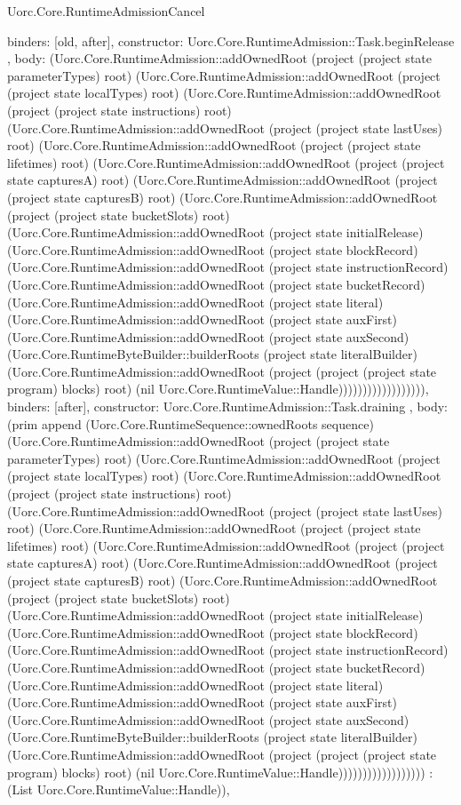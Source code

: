 \begin{lexlean}{Uorc.Core.RuntimeAdmissionCancel}
\begin{semanticmodule}
{{{        binders: [old, after],
        constructor: Uorc.Core.RuntimeAdmission::Task.beginRelease
      },
      {
        body: (Uorc.Core.RuntimeAdmission::addOwnedRoot (project (project state parameterTypes) root) (Uorc.Core.RuntimeAdmission::addOwnedRoot (project (project state localTypes) root) (Uorc.Core.RuntimeAdmission::addOwnedRoot (project (project state instructions) root) (Uorc.Core.RuntimeAdmission::addOwnedRoot (project (project state lastUses) root) (Uorc.Core.RuntimeAdmission::addOwnedRoot (project (project state lifetimes) root) (Uorc.Core.RuntimeAdmission::addOwnedRoot (project (project state capturesA) root) (Uorc.Core.RuntimeAdmission::addOwnedRoot (project (project state capturesB) root) (Uorc.Core.RuntimeAdmission::addOwnedRoot (project (project state bucketSlots) root) (Uorc.Core.RuntimeAdmission::addOwnedRoot (project state initialRelease) (Uorc.Core.RuntimeAdmission::addOwnedRoot (project state blockRecord) (Uorc.Core.RuntimeAdmission::addOwnedRoot (project state instructionRecord) (Uorc.Core.RuntimeAdmission::addOwnedRoot (project state bucketRecord) (Uorc.Core.RuntimeAdmission::addOwnedRoot (project state literal) (Uorc.Core.RuntimeAdmission::addOwnedRoot (project state auxFirst) (Uorc.Core.RuntimeAdmission::addOwnedRoot (project state auxSecond) (Uorc.Core.RuntimeByteBuilder::builderRoots (project state literalBuilder) (Uorc.Core.RuntimeAdmission::addOwnedRoot (project (project (project state program) blocks) root) (nil Uorc.Core.RuntimeValue::Handle)))))))))))))))))),
        binders: [after],
        constructor: Uorc.Core.RuntimeAdmission::Task.draining
      },
      {
        body: (prim append (Uorc.Core.RuntimeSequence::ownedRoots sequence) (Uorc.Core.RuntimeAdmission::addOwnedRoot (project (project state parameterTypes) root) (Uorc.Core.RuntimeAdmission::addOwnedRoot (project (project state localTypes) root) (Uorc.Core.RuntimeAdmission::addOwnedRoot (project (project state instructions) root) (Uorc.Core.RuntimeAdmission::addOwnedRoot (project (project state lastUses) root) (Uorc.Core.RuntimeAdmission::addOwnedRoot (project (project state lifetimes) root) (Uorc.Core.RuntimeAdmission::addOwnedRoot (project (project state capturesA) root) (Uorc.Core.RuntimeAdmission::addOwnedRoot (project (project state capturesB) root) (Uorc.Core.RuntimeAdmission::addOwnedRoot (project (project state bucketSlots) root) (Uorc.Core.RuntimeAdmission::addOwnedRoot (project state initialRelease) (Uorc.Core.RuntimeAdmission::addOwnedRoot (project state blockRecord) (Uorc.Core.RuntimeAdmission::addOwnedRoot (project state instructionRecord) (Uorc.Core.RuntimeAdmission::addOwnedRoot (project state bucketRecord) (Uorc.Core.RuntimeAdmission::addOwnedRoot (project state literal) (Uorc.Core.RuntimeAdmission::addOwnedRoot (project state auxFirst) (Uorc.Core.RuntimeAdmission::addOwnedRoot (project state auxSecond) (Uorc.Core.RuntimeByteBuilder::builderRoots (project state literalBuilder) (Uorc.Core.RuntimeAdmission::addOwnedRoot (project (project (project state program) blocks) root) (nil Uorc.Core.RuntimeValue::Handle)))))))))))))))))) : (List Uorc.Core.RuntimeValue::Handle)),
}}}
\end{semanticmodule}
\end{lexlean}
